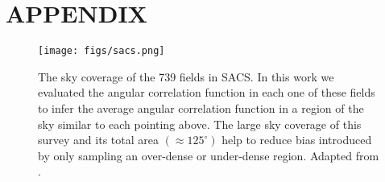 \documentclass[preprint]{aastex63}
\begin{document}




\newpage
\section*{APPENDIX}

\begin{figure}[!ht]
    \centering
    \texttt{[image: figs/sacs.png]}
    \label{fig:sacs}
    \caption{The sky coverage of the 739 fields in SACS. In this work we evaluated the angular correlation function in each one of these fields
    to infer the average angular correlation function in a region of the sky similar to each pointing above. The large sky coverage of this survey and its total area $(\approx 125^{\circ} )$ 
    help to reduce bias introduced by only sampling an over-dense or under-dense region. Adapted from \citet{dai_2015}.
    }
\end{figure}
\end{document}
